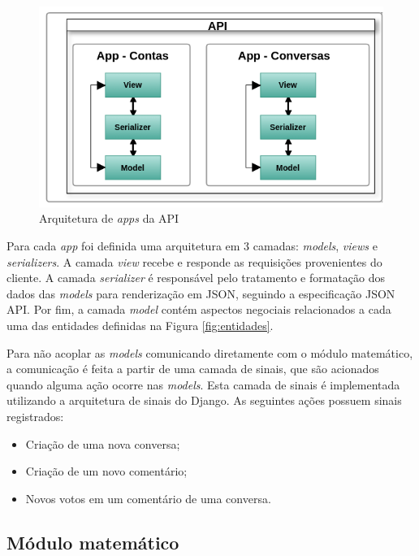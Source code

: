 	\begin{figure}[h!]
	\centering
	\includegraphics[scale=0.8]{figuras/arquitetura_api.png}
	\caption{Arquitetura de \textit{apps} da API}
	\label{fig:arquitetura_api}
	\end{figure}

	Para cada \textit{app} foi definida uma arquitetura
	em 3 camadas: \textit{models}, \textit{views} e \textit{serializers}.
	A camada \textit{view} recebe e responde as requisições provenientes do cliente.
	A camada \textit{serializer} é responsável pelo tratamento e formatação dos dados das \textit{models}
	para renderização em JSON, seguindo a especificação JSON API.
	Por fim, a camada \textit{model} contém aspectos negociais relacionados a cada uma das entidades definidas na 
	Figura \ref{fig:entidades}.
	
	Para não acoplar as \textit{models} comunicando diretamente com o módulo matemático,
	a comunicação é feita a partir de uma camada de sinais, que são acionados quando alguma ação ocorre nas \textit{models}.
	Esta camada de sinais é implementada utilizando a arquitetura de sinais do Django.
	As seguintes ações possuem sinais registrados:
	
	\begin{itemize}
	 \item Criação de uma nova conversa;
	 \item Criação de um novo comentário;
	 \item Novos votos em um comentário de uma conversa.
	\end{itemize}

    
    
    \subsection{Módulo matemático}
	
